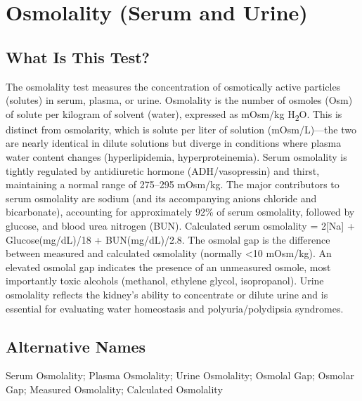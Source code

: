 \chapter{Osmolality (Serum and Urine)}

\section*{What Is This Test?}
The osmolality test measures the concentration of osmotically active particles (solutes) in serum, plasma, or urine. Osmolality is the number of osmoles (Osm) of solute per kilogram of solvent (water), expressed as mOsm/kg H\textsubscript{2}O. This is distinct from osmolarity, which is solute per liter of solution (mOsm/L)---the two are nearly identical in dilute solutions but diverge in conditions where plasma water content changes (hyperlipidemia, hyperproteinemia). Serum osmolality is tightly regulated by antidiuretic hormone (ADH/vasopressin) and thirst, maintaining a normal range of 275--295 mOsm/kg. The major contributors to serum osmolality are sodium (and its accompanying anions chloride and bicarbonate), accounting for approximately 92\% of serum osmolality, followed by glucose, and blood urea nitrogen (BUN). Calculated serum osmolality = 2[Na] + Glucose(mg/dL)/18 + BUN(mg/dL)/2.8. The osmolal gap is the difference between measured and calculated osmolality (normally <10 mOsm/kg). An elevated osmolal gap indicates the presence of an unmeasured osmole, most importantly toxic alcohols (methanol, ethylene glycol, isopropanol). Urine osmolality reflects the kidney's ability to concentrate or dilute urine and is essential for evaluating water homeostasis and polyuria/polydipsia syndromes.

\section*{Alternative Names}
Serum Osmolality; Plasma Osmolality; Urine Osmolality; Osmolal Gap; Osmolar Gap; Measured Osmolality; Calculated Osmolality

